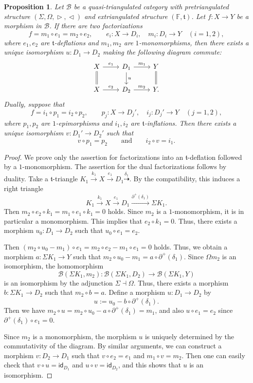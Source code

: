 \documentclass[a4paper,reqno,10pt]{amsart}
\newtheorem{proposition}[proposition]{Proposition}
\theoremstyle{definition}
\theoremstyle{definition}
\theoremstyle{definition}
\theoremstyle{definition}
\theoremstyle{plain}
\newcommand{\id}{\mathsf{id}}
\newcommand{\ft}{\mathfrak{t}}
\newcommand{\BF}{\mathbb{F}}
\newcommand{\CB}{\mathcal{B}}
\begin{document}
\begin{proposition}
\label{prop:fac_system}
Let $\CB$ be a quasi-triangulated category with pretriangulated structure $(\Sigma,\Omega,\vartriangleright,\vartriangleleft)$ and extriangulated structure $(\BF,\ft)$. Let $f\colon X\to Y$ be a morphism in $\CB$. If there are two factorizations
\[
f = m_1 \circ e_1 = m_2 \circ e_2,
\qquad
e_i\colon X\to D_i,\quad m_i\colon D_i\to Y
\quad (i=1,2),
\]
where $e_1,e_2$ are $\ft$-deflations and $m_1,m_2$ are
$1$-monomorphisms, then there exists a unique isomorphism
$u\colon D_1\to D_2$ making the following diagram commute:
\[
\begin{tikzcd}
X \arrow[r,"e_1"]\arrow[d,equal] & D_1 \arrow[d,"u"] \arrow[r,"m_1"] & Y \arrow[d,equal] \\
X \arrow[r,"e_2"] & D_2 \arrow[r,"m_2"] & Y.
\end{tikzcd}
\]
Dually, suppose that
\[
f=i_1\circ p_1=i_2\circ p_2,\qquad
p_j\colon X\to D_j',\quad i_j\colon D_j'\to Y
\quad (j=1,2),
\]
where $p_1,p_2$ are $1$-epimorphisms and $i_1,i_2$ are
$\ft$-inflations. Then there exists a unique isomorphism
$v\colon D_1'\to D_2'$ such that
\[
v\circ p_1=p_2
\qquad\text{and}\qquad
i_2\circ v=i_1.
\]
\end{proposition}
\begin{proof}
We prove only the assertion for factorizations into an
$\ft$-deflation followed by a $1$-monomorphism. The assertion for the
dual factorizations follows by duality.
Take a $\ft$-triangle $K_1\xrightarrow{k_1}X\xrightarrow{e_1}D_1\overset{\delta_1}{\dashrightarrow}$.
By the compatibility, this induces a right triangle
\[
K_1\xrightarrow{k_1}X\xrightarrow{e_1}D_1
\xrightarrow{\partial^+(\delta_1)}\Sigma K_1.
\]
Then $m_2\circ e_2\circ k_1=m_1\circ e_1\circ k_1=0$ holds. Since $m_2$ is a $1$-monomorphism, it is in particular a monomorphism. This implies that $e_2\circ k_1=0$. Thus, there exists a morphism $u_0\colon D_1\to D_2$ such that $u_0\circ e_1=e_2$.

Then $(m_2\circ u_0-m_1)\circ e_1=m_2\circ e_2-m_1\circ e_1=0$ holds. Thus, we obtain a morphism $a\colon\Sigma K_1\to Y$ such that
$m_2\circ u_0-m_1=a\circ \partial^+(\delta_1)$. Since $\Omega m_2$ is an isomorphism, the homomorphism
\[
\CB(\Sigma K_1,m_2)\colon
\CB(\Sigma K_1,D_2)\to
\CB(\Sigma K_1,Y)
\]
is an isomorphism by the adjunction $\Sigma\dashv\Omega$.
Thus, there exists a morphism
$b\colon\Sigma K_1\to D_2$ such that $m_2\circ b=a$.
Define a morphism $u\colon D_1\to D_2$ by
\[
u:=u_0-b\circ \partial^+(\delta_1).
\]
Then we have $m_2\circ u=m_2\circ u_0-a\circ \partial^+(\delta_1)=m_1$, and also $u\circ e_1=e_2$ since $\partial^+(\delta_1)\circ e_1=0$.

Since $m_2$ is a monomorphism, the morphism $u$ is uniquely determined by the commutativity of the diagram.  
By similar arguments, we can construct a morphism $v\colon D_2\to D_1$ such that $v\circ e_2=e_1$ and $m_1\circ v=m_2$. Then one can easily check that $v\circ u=\id_{D_1}$ and $u\circ v=\id_{D_2}$,
and this shows that $u$ is an isomorphism.
\end{proof}
\end{document}
